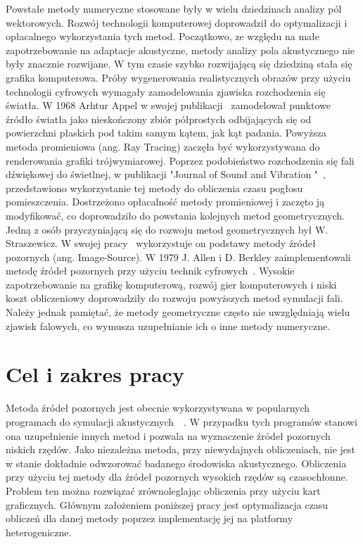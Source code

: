 Powstałe metody numeryczne stosowane były w wielu dziedzinach analizy pól wektorowych. Rozwój technologii komputerowej doprowadził do optymalizacji i opłacalnego wykorzystania tych metod. Początkowo, ze względu na małe zapotrzebowanie na adaptacje akustyczne, metody analizy pola akustycznego nie były znacznie rozwijane. W tym czasie szybko rozwijającą się dziedziną stała się grafika komputerowa. Próby wygenerowania realistycznych obrazów przy użyciu technologii cyfrowych wymagały zamodelowania zjawiska rozchodzenia się światła. W 1968 Arhtur Appel w swojej publikacji~\cite{b3} zamodelował punktowe źródło światła jako nieskończony zbiór półprostych odbijających się od powierzchni płaskich pod takim samym kątem, jak kąt padania.  Powyższa  metoda promieniowa (ang. Ray Tracing) zaczęła być wykorzystywana do  renderowania grafiki trójwymiarowej. Poprzez podobieństwo rozchodzenia się fali dźwiękowej do świetlnej, w publikacji "Journal of Sound and Vibration "~\cite{b4}, przedstawiono wykorzystanie tej metody do obliczenia czasu pogłosu pomieszczenia. Dostrzeżono opłacalność metody promieniowej i zaczęto ją modyfikować, co doprowadziło do powstania kolejnych metod geometrycznych. Jedną z osób przyczyniającą się do rozwoju metod geometrycznych był W. Straszewicz. W swojej pracy~\cite{b5} wykorzystuje  on podstawy metody źródeł pozornych (ang. Image-Source). W 1979 J. Allen i D. Berkley zaimplementowali  metodę źródeł pozornych przy użyciu technik cyfrowych~\cite{b6}. Wysokie zapotrzebowanie na grafikę komputerową, rozwój gier komputerowych i niski koszt obliczeniowy doprowadziły do rozwoju powyższych metod symulacji fali. Należy jednak pamiętać, że metody geometryczne często nie uwzględniają wielu zjawisk falowych, co wymusza uzupełnianie ich o inne metody numeryczne.  



\section{Cel i zakres pracy}\label{sec:celizakres}

Metoda źródeł pozornych jest obecnie wykorzystywana w popularnych programach do symulacji akustycznych~\cite{b7}~\cite{b8}. W przypadku tych programów stanowi ona uzupełnienie innych metod i pozwala na wyznaczenie źródeł pozornych niskich rzędów. Jako niezależna metoda, przy niewydajnych obliczeniach, nie jest w stanie dokładnie odwzorować badanego środowiska akustycznego. Obliczenia przy użyciu tej metody dla źródeł pozornych wysokich rzędów są czasochłonne. Problem ten można rozwiązać zrównoleglając obliczenia przy użyciu kart graficznych. Głównym założeniem poniższej pracy jest optymalizacja czasu obliczeń dla danej metody poprzez implementację jej na platformy heterogeniczne.

